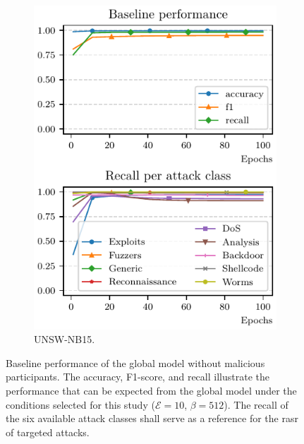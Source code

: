 \begin{figure}[t]
\begin{subfigure}{.45\linewidth}
    \includegraphics[width=\linewidth]{figures/nb15/baseline}
    \caption{
      UNSW-NB15.
      \label{fig:assess.baseline.nb15}
    }
  \end{subfigure}
  \caption[
    Baseline performance of the global model without malicious participants.
  ]{
    Baseline performance of the global model without malicious participants.
    The accuracy, F1-score, and recall illustrate the performance that can be expected from the global model under the conditions selected for this study ($\mathcal{E}=10$, $\beta=512$).
    The recall of the six available attack classes shall serve as a reference for the \gls{rasr} of targeted attacks.
    \label{fig:assess.baseline}
  }
\end{figure}




